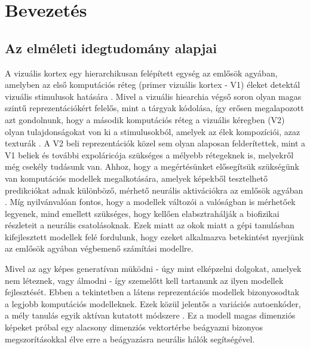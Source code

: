 \documentclass[12pt, english]{article}
\begin{document}
\tableofcontents
\newpage

\section{Bevezetés}

\vspace{7mm}

\subsection{Az elméleti idegtudomány alapjai}

\vspace{7mm}

\par A vizuális kortex egy hierarchikusan felépített egység az emlősök agyában, amelyben az első komputációs réteg (primer vizuális kortex - V1) éleket detektál vizuális stimulusok hatására \cite{hubel1968receptive}. Mivel a vizuális hiearchia végső soron olyan magas szintű reprezentációkért felelős, mint a tárgyak kódolása, így erősen megalapozott azt gondolnunk, hogy a második komputációs réteg a vizuális kéregben (V2) olyan tulajdonságokat von ki a stimulusokból, amelyek az élek kompozíciói, azaz texturák \cite{ZiembaV2}. A V2 beli reprezentációk közel sem olyan alaposan felderítettek, mint a V1 beliek és további expoláricója szükséges a mélyebb rétegeknek is, melyekről még csekély tudásunk van. Ahhoz, hogy a megértésünket elősegítsük szükségünk van komputációs modellek megalkotására, amelyek képekből tesztelhető predikciókat adnak különböző, mérhető neurális aktivációkra az emlősök agyában \cite{yamins2014performance}. Míg nyilvánvalóan fontos, hogy a modellek változói a valóságban is mérhetőek legyenek, mind emellett szükséges, hogy kellően elabsztrahálják a biofizikai részleteit a neurális csatolásoknak. Ezek miatt az okok miatt a gépi tanulásban kifejlesztett modellek felé fordulunk, hogy ezeket alkalmazva betekintést nyerjünk az emlősök agyában végbemenő számítási modellre. 

\vspace{4mm}

\par Mivel az agy képes generatívan müködni - úgy mint elképzelni dolgokat, amelyek nem léteznek, vagy álmodni - így szemelőtt kell tartanunk az ilyen modellek fejlesztését. Ebben a tekintetben a látens reprezentációs modellek bizonyosodtak a legjobb komputációs modelleknek. Ezek közül jelentős a variációs autoenkóder, a mély tanulás egyik aktívan kutatott módszere \cite{kingma2013auto}. Ez a modell magas dimenziós képeket próbal egy alacsony dimenziós vektortérbe beágyazni bizonyos megszorításokkal élve erre a beágyazásra neurális hálók segítségével.
\end{document}
